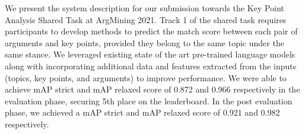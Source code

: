 We present the system description for our submission towards the Key Point Analysis Shared Task at ArgMining 2021. Track 1 of the shared task requires participants to develop methods to predict the match score between each pair of arguments and key points, provided they belong to the same topic under the same stance. We leveraged existing state of the art pre-trained language models along with incorporating additional data and features extracted from the inputs (topics, key points, and arguments) to improve performance. We were able to achieve mAP strict and mAP relaxed score of 0.872 and 0.966 respectively in the evaluation phase, securing 5th place on the leaderboard. In the post evaluation phase, we achieved a mAP strict and mAP relaxed score of 0.921 and 0.982 respectively.
